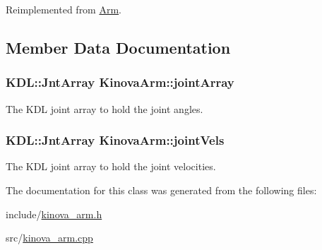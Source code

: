 Reimplemented from \hyperlink{class_arm_a9bfe3a3f230c8fa8a39f88cce2d6b597}{Arm}.



\subsection{Member Data Documentation}
\subsubsection[{\texorpdfstring{joint\+Array}{jointArray}}]{\setlength{\rightskip}{0pt plus 5cm}K\+D\+L\+::\+Jnt\+Array Kinova\+Arm\+::joint\+Array}\hypertarget{class_kinova_arm_a47ddba255203039c2d7d3ceb48b2c4ac}{}\label{class_kinova_arm_a47ddba255203039c2d7d3ceb48b2c4ac}


The K\+DL joint array to hold the joint angles. 

\subsubsection[{\texorpdfstring{joint\+Vels}{jointVels}}]{\setlength{\rightskip}{0pt plus 5cm}K\+D\+L\+::\+Jnt\+Array Kinova\+Arm\+::joint\+Vels}\hypertarget{class_kinova_arm_adeab92c27d6555029a30f5bcbba8bfab}{}\label{class_kinova_arm_adeab92c27d6555029a30f5bcbba8bfab}


The K\+DL joint array to hold the joint velocities. 



The documentation for this class was generated from the following files\+:\begin{DoxyCompactItemize}
\item 
include/\hyperlink{kinova__arm_8h}{kinova\+\_\+arm.\+h}\item 
src/\hyperlink{kinova__arm_8cpp}{kinova\+\_\+arm.\+cpp}\end{DoxyCompactItemize}

